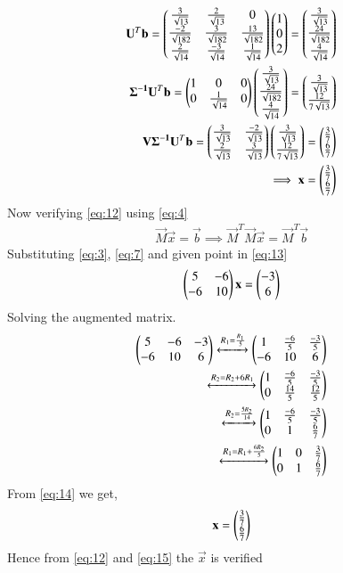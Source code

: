 \documentclass[journal,12pt,twocolumn]{IEEEtran}
\begin{document}
\begin{align}
\mathbf{U}^T\mathbf{b}=\begin{pmatrix}\frac{3}{\sqrt{13}}&\frac{2}{\sqrt{13}}&0\\\frac{-2}{\sqrt{182}}&\frac{3}{\sqrt{182}}&\frac{13}{\sqrt{182}}\\\frac{2}{\sqrt{14}}&\frac{-3}{\sqrt{14}}&\frac{1}{\sqrt{14}}\end{pmatrix}\begin{pmatrix}1\\0\\2\end{pmatrix} = \begin{pmatrix}\frac{3}{\sqrt{13}}\\\frac{24}{\sqrt{182}}\\\frac{4}{\sqrt{14}}\end{pmatrix}\\
\mathbf{\Sigma^{-1}}\mathbf{U}^T\mathbf{b}=\begin{pmatrix}1&0&0\\0&\frac{1}{\sqrt{14}}&0\end{pmatrix}\begin{pmatrix}\frac{3}{\sqrt{13}}\\\frac{24}{\sqrt{182}}\\\frac{4}{\sqrt{14}}\end{pmatrix}=\begin{pmatrix}\frac{3}{\sqrt{13}}\\\frac{12}{7\sqrt{13}}\end{pmatrix}\\
\mathbf{V}\mathbf{\Sigma^{-1}}\mathbf{U}^T\mathbf{b}=\begin{pmatrix}\frac{3}{\sqrt{13}}&\frac{-2}{\sqrt{13}}\\\frac{2}{\sqrt{13}}&\frac{3}{\sqrt{13}}\end{pmatrix}\begin{pmatrix}\frac{3}{\sqrt{13}}\\\frac{12}{7\sqrt{13}}\end{pmatrix}=\begin{pmatrix}\frac{3}{7}\\\frac{6}{7}\end{pmatrix}\\
\implies\mathbf{x}=\begin{pmatrix}\frac{3}{7}\\\frac{6}{7}\end{pmatrix}\label{eq:12}
\end{align}
Now verifying \eqref{eq:12} using \eqref{eq:4}
\begin{align}
\vec{M}\vec{x}=\vec{b}
\implies\vec{M}^T\vec{M}\vec{x} = \vec{M}^T\vec{b}\label{eq:13}
\end{align}
Substituting \eqref{eq:3}, \eqref{eq:7} and given point in \eqref{eq:13}
\begin{align}
\begin{pmatrix}5&-6\\-6&10\end{pmatrix}\mathbf{x} = \begin{pmatrix}-3\\6\end{pmatrix}\\
\end{align}
Solving the augmented matrix.
\begin{align}
\begin{pmatrix}5&-6&-3\\-6&10&6\end{pmatrix}\xleftrightarrow{R_1=\frac{R_1}{5}}\begin{pmatrix}1&\frac{-6}{5}&\frac{-3}{5}\\-6&10&6\end{pmatrix}\\
\xleftrightarrow{R_2=R_2+6R_1}\begin{pmatrix}1&\frac{-6}{5}&\frac{-3}{5}\\0&\frac{14}{5}&\frac{12}{5}\end{pmatrix}\\
\xleftrightarrow{R_2=\frac{5R_2}{14}}\begin{pmatrix}1&\frac{-6}{5}&\frac{-3}{5}\\0&1&\frac{6}{7}\end{pmatrix}\\
\xleftrightarrow{R_1=R_1+\frac{6R_2}{5}}\begin{pmatrix}1&0&\frac{3}{7}\\0&1&\frac{6}{7}\end{pmatrix}\label{eq:14}
\end{align}
From \eqref{eq:14} we get,
\begin{align}
\mathbf{x}=\begin{pmatrix}\frac{3}{7}\\\frac{6}{7}\end{pmatrix}\label{eq:15}
\end{align}
Hence from \eqref{eq:12} and \eqref{eq:15} the $\vec{x}$ is verified
\end{document}
